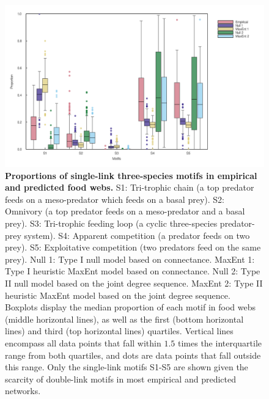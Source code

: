 \begin{figure}[!h]
  \centering
  \includegraphics[width=\textwidth]{figures/article2/motifs_distribution.png}
  \caption{\textbf{Proportions of single-link three-species motifs in empirical and predicted food webs.}
  S1: Tri-trophic chain (a top predator feeds on a meso-predator which feeds on
  a basal prey). S2: Omnivory (a top predator feeds on a meso-predator and a
  basal prey). S3: Tri-trophic feeding loop (a cyclic three-species
  predator-prey system). S4: Apparent competition (a predator feeds on two
  prey). S5: Exploitative competition (two predators feed on the same prey).
  Null 1: Type I null model based on connectance. MaxEnt 1: Type I heuristic
  MaxEnt model based on connectance. Null 2: Type II null model based on the
  joint degree sequence. MaxEnt 2: Type II heuristic MaxEnt model based on the
  joint degree sequence. Boxplots display the median proportion of each motif in
  food webs (middle horizontal lines), as well as the first (bottom horizontal
  lines) and third (top horizontal lines) quartiles. Vertical lines encompass
  all data points that fall within $1.5$ times the interquartile range from both
  quartiles, and dots are data points that fall outside this range. Only the
  single-link motifs S1-S5 are shown given the scarcity of double-link motifs in
  most empirical and predicted networks. }
\label{fig:motifs}
\end{figure}

\clearpage

